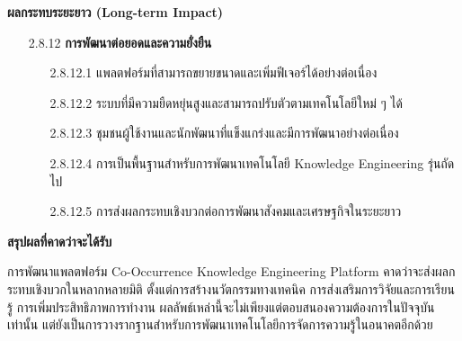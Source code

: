 \documentclass[12pt,a4paper]{article}
\begin{document}
\begin{enumerate}[leftmargin=2cm]
{        \vspace{0.8cm}

        \textbf{ผลกระทบระยะยาว (Long-term Impact)}

        \begin{enumerate}
            \item[2.8.12] \textbf{การพัฒนาต่อยอดและความยั่งยืน}
            \begin{enumerate}
                \item[2.8.12.1] แพลตฟอร์มที่สามารถขยายขนาดและเพิ่มฟีเจอร์ได้อย่างต่อเนื่อง
                \item[2.8.12.2] ระบบที่มีความยืดหยุ่นสูงและสามารถปรับตัวตามเทคโนโลยีใหม่ ๆ ได้
                \item[2.8.12.3] ชุมชนผู้ใช้งานและนักพัฒนาที่แข็งแกร่งและมีการพัฒนาอย่างต่อเนื่อง
                \item[2.8.12.4] การเป็นพื้นฐานสำหรับการพัฒนาเทคโนโลยี Knowledge Engineering รุ่นถัดไป
                \item[2.8.12.5] การส่งผลกระทบเชิงบวกต่อการพัฒนาสังคมและเศรษฐกิจในระยะยาว
            \end{enumerate}
        \end{enumerate}

        \vspace{0.5cm}

        \textbf{สรุปผลที่คาดว่าจะได้รับ}

        \hspace{1cm}การพัฒนาแพลตฟอร์ม Co-Occurrence Knowledge Engineering Platform คาดว่าจะส่งผลกระทบเชิงบวกในหลากหลายมิติ ตั้งแต่การสร้างนวัตกรรมทางเทคนิค การส่งเสริมการวิจัยและการเรียนรู้ การเพิ่มประสิทธิภาพการทำงาน ผลลัพธ์เหล่านี้จะไม่เพียงแต่ตอบสนองความต้องการในปัจจุบันเท่านั้น แต่ยังเป็นการวางรากฐานสำหรับการพัฒนาเทคโนโลยีการจัดการความรู้ในอนาคตอีกด้วย
    }

    \vspace{3cm}


\end{enumerate}
\end{document}

